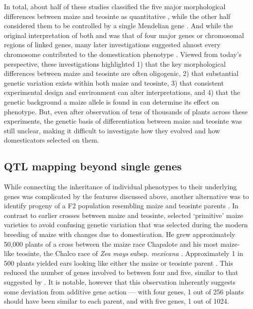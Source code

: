 \documentclass[9pt,twocolumn,twoside]{rilabRxiv}
\begin{document}
In total, about half of these studies classified the five major morphological differences between maize and teosinte as quantitative  \citep{collins1920, mangelsdorf1947, rogers1950a, rogers1950b}, while the other half considered them to be controlled by a single Mendelian gene \citep{langham1940, galinat1971, galinat1988}.
And while the original interpretation of both \citet{mangelsdorf1939} and \citet{beadle1939} was that of four major genes or chromosomal regions of linked genes, many later investigations suggested almost every chromosome contributed to the domestication phenotype \citep{mangelsdorf1947, rogers1950a, rogers1950b}.
Viewed from today's perspective, these investigations highlighted 1) that the key morphological differences between maize and teosinte are often oligogenic, 2) that substantial genetic variation exists within both maize and teosinte, 3) that consistent experimental design and environment can alter interpretations, and 4) that the genetic background a maize allele is found in can determine its effect on phenotype.
But, even after observation of tens of thousands of plants across these experiments, the genetic basis of differentiation between maize and teosinte was still unclear, making it difficult to investigate how they evolved and how domesticators selected on them.

\subsection*{QTL mapping beyond single genes}

While connecting the inheritance of individual phenotypes to their underlying genes was complicated by the features discussed above, another alternative was to identify progeny of a F2 population resembling maize and teosinte parents \citep{beadle1972}.
In  contrast to earlier crosses between maize and teosinte, \citet{beadle1972} selected `primitive' maize varieties to avoid confusing genetic variation that was selected during the modern breeding of maize with changes due to domestication.
He grew approximately 50,000 plants of a cross between the maize race Chapalote and his most maize-like teosinte, the Chalco race of \textit{Zea mays} subsp. \textit{mexicana} \citep{beadle1972, beadle1980}.
Approximately 1 in 500 plants yielded ears looking like either the maize or teosinte parent \citep{beadle1972, beadle1980}.
This reduced the number of genes involved to between four and five, similar to that suggested by \citet{langham1940}.
It is notable, however that this observation inherently suggests some deviation from additive gene action --- with four genes, 1 out of 256 plants should have been similar to each parent, and with five genes, 1 out of 1024.
\end{document}
